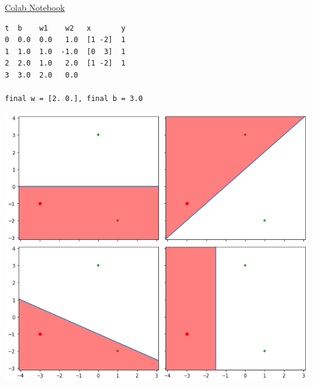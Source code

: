 \begin{solution}
  \href{https://colab.research.google.com/drive/1d8LCVQuZFkL9tPiClGe6zHGv2aIcE8hd?usp=sharing}{Colab Notebook}
  \begin{verbatim}
t  b    w1    w2   x       y
0  0.0  0.0   1.0  [1 -2]  1
1  1.0  1.0  -1.0  [0  3]  1
2  2.0  1.0   2.0  [1 -2]  1
3  3.0  2.0   0.0

final w = [2. 0.], final b = 3.0
  \end{verbatim}

  \includegraphics[width=\textwidth]{images/4a.png}
\end{solution}


